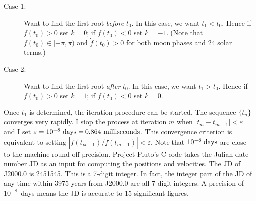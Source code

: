 \documentclass[12pt]{article}
\begin{document}
\begin{CJK}{UTF8}{bkai}
\begin{description}
\item[Case 1:] Want to find the first root {\em before} $t_0$. In this case, we want
$t_1<t_0$. Hence if $f(t_0) >0$ set $k=0$; if $f(t_0) <0$ set $k=-1$. (Note that
$f(t_0) \in [-\pi,\pi)$ and $\dot{f}(t_0) > 0$ for both moon phases and 24 solar terms.)

\item[Case 2:] Want to find the first root {\em after} $t_0$. In this case, we want
$t_1>t_0$. Hence if $f(t_0) >0$ set $k=1$; if $f(t_0) <0$ set $k=0$.
\end{description}

Once $t_1$ is determined, the iteration procedure can be started. The sequence $\{t_n\}$ 
converges very rapidly. I stop the process at iteration $m$ when $|t_m-t_{m-1}|<\varepsilon$
and I set $\varepsilon=10^{-8}~{\rm days}=0.864~{\rm milliseconds}$. This convergence 
criterion is equivalent to setting $|f(t_{m-1})/\dot{f}(t_{m-1})| < \varepsilon$. 
Note that $10^{-8}~{\rm days}$ are close to the machine round-off precision. 
Project Pluto's C code takes the Julian date number JD as an input for computing 
the positions and velocities. The JD of J2000.0 is 2451545. This is a 7-digit integer. 
In fact, the integer part of the JD of any time within 3975 years from J2000.0 are all 
7-digit integers. 
A precision of $10^{-8}$~days means the JD is accurate to 15 significant figures.


\end{CJK}
\end{document}
